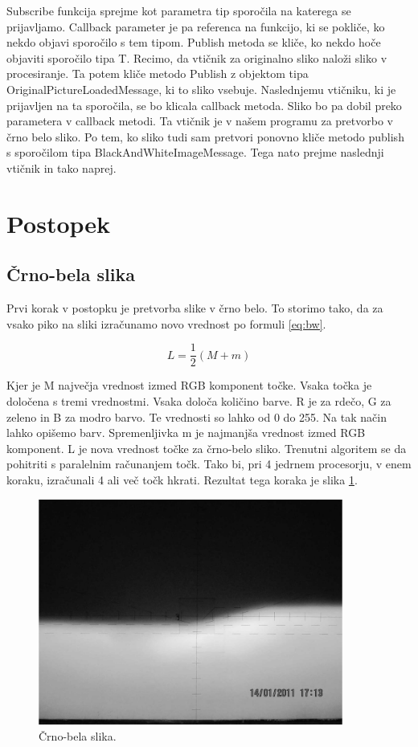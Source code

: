 \documentclass[oneside, a4paper, 12pt]{book}
\begin{document}
Subscribe funkcija sprejme kot parametra tip sporočila na katerega se prijavljamo. Callback parameter je pa referenca na funkcijo, ki se pokliče, ko nekdo objavi sporočilo s tem tipom. Publish metoda se kliče, ko nekdo hoče objaviti sporočilo tipa T.
Recimo, da vtičnik za originalno sliko naloži sliko v procesiranje. Ta potem kliče metodo Publish z objektom tipa OriginalPictureLoadedMessage, ki to sliko vsebuje. Naslednjemu vtičniku, ki je prijavljen na ta sporočila, se bo klicala callback metoda. Sliko bo pa dobil preko parametera v callback metodi. Ta vtičnik je v našem programu za pretvorbo v črno belo sliko. Po tem, ko sliko tudi sam pretvori ponovno kliče metodo publish s sporočilom tipa BlackAndWhiteImageMessage. Tega nato prejme naslednji vtičnik in tako naprej.

\section{Postopek}
\subsection{Črno-bela slika}
Prvi korak v postopku je pretvorba slike v črno belo. To storimo tako, da za vsako piko na sliki izračunamo novo vrednost po formuli \ref{eq:bw}.

\begin{equation}
L=\dfrac{1}{2}(M+m)
\label{eq:bw}
\end{equation}

Kjer je M največja vrednost izmed RGB komponent točke. Vsaka točka je določena s tremi vrednostmi. Vsaka določa količino barve. R je za rdečo, G za zeleno in B za modro barvo. Te vrednosti so lahko od 0 do 255. Na tak način lahko opišemo barv. Spremenljivka m je najmanjša vrednost izmed RGB komponent. L je nova vrednost točke za črno-belo sliko. 
Trenutni algoritem se da pohitriti s paralelnim računanjem točk. Tako bi, pri 4 jedrnem procesorju, v enem koraku, izračunali 4 ali več točk hkrati.
Rezultat tega koraka je slika \ref{pic:bw}.



\begin{figure}
\begin{center}
\includegraphics[width=10cm]{slike/crno-bela-slika.jpg}
\end{center}
\caption{Črno-bela slika.}
\label{pic:bw}
\end{figure}
\end{document}
